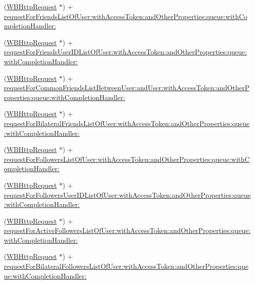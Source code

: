\begin{DoxyCompactItemize}
\item 
(\mbox{\hyperlink{interface_w_b_http_request}{W\+B\+Http\+Request}} $\ast$) + \mbox{\hyperlink{category_w_b_http_request_07_weibo_user_08_a6bec26ae942e00b30352846353c10f4d}{request\+For\+Friends\+List\+Of\+User\+:with\+Access\+Token\+:and\+Other\+Properties\+:queue\+:with\+Completion\+Handler\+:}}
\item 
(\mbox{\hyperlink{interface_w_b_http_request}{W\+B\+Http\+Request}} $\ast$) + \mbox{\hyperlink{category_w_b_http_request_07_weibo_user_08_a388ba16ea6e89e121893833f2a7d7b86}{request\+For\+Friends\+User\+I\+D\+List\+Of\+User\+:with\+Access\+Token\+:and\+Other\+Properties\+:queue\+:with\+Completion\+Handler\+:}}
\item 
(\mbox{\hyperlink{interface_w_b_http_request}{W\+B\+Http\+Request}} $\ast$) + \mbox{\hyperlink{category_w_b_http_request_07_weibo_user_08_a869234d6cc01353dcfc8f0f47ad06f5c}{request\+For\+Common\+Friends\+List\+Between\+User\+:and\+User\+:with\+Access\+Token\+:and\+Other\+Properties\+:queue\+:with\+Completion\+Handler\+:}}
\item 
(\mbox{\hyperlink{interface_w_b_http_request}{W\+B\+Http\+Request}} $\ast$) + \mbox{\hyperlink{category_w_b_http_request_07_weibo_user_08_a8266e8e1c5230407f29ee63e05e98b38}{request\+For\+Bilateral\+Friends\+List\+Of\+User\+:with\+Access\+Token\+:and\+Other\+Properties\+:queue\+:with\+Completion\+Handler\+:}}
\item 
(\mbox{\hyperlink{interface_w_b_http_request}{W\+B\+Http\+Request}} $\ast$) + \mbox{\hyperlink{category_w_b_http_request_07_weibo_user_08_a0437dae63fa8fe40c7c5b323b45e0094}{request\+For\+Followers\+List\+Of\+User\+:with\+Access\+Token\+:and\+Other\+Properties\+:queue\+:with\+Completion\+Handler\+:}}
\item 
(\mbox{\hyperlink{interface_w_b_http_request}{W\+B\+Http\+Request}} $\ast$) + \mbox{\hyperlink{category_w_b_http_request_07_weibo_user_08_a62303f19ac35267cff108384061f1de7}{request\+For\+Followers\+User\+I\+D\+List\+Of\+User\+:with\+Access\+Token\+:and\+Other\+Properties\+:queue\+:with\+Completion\+Handler\+:}}
\item 
(\mbox{\hyperlink{interface_w_b_http_request}{W\+B\+Http\+Request}} $\ast$) + \mbox{\hyperlink{category_w_b_http_request_07_weibo_user_08_a158110b5d079d1ddd7baae029a8a36fb}{request\+For\+Active\+Followers\+List\+Of\+User\+:with\+Access\+Token\+:and\+Other\+Properties\+:queue\+:with\+Completion\+Handler\+:}}
\item 
(\mbox{\hyperlink{interface_w_b_http_request}{W\+B\+Http\+Request}} $\ast$) + \mbox{\hyperlink{category_w_b_http_request_07_weibo_user_08_a5c4b501746e378232db99ae045e49889}{request\+For\+Bilateral\+Followers\+List\+Of\+User\+:with\+Access\+Token\+:and\+Other\+Properties\+:queue\+:with\+Completion\+Handler\+:}}

\end{DoxyCompactItemize}
